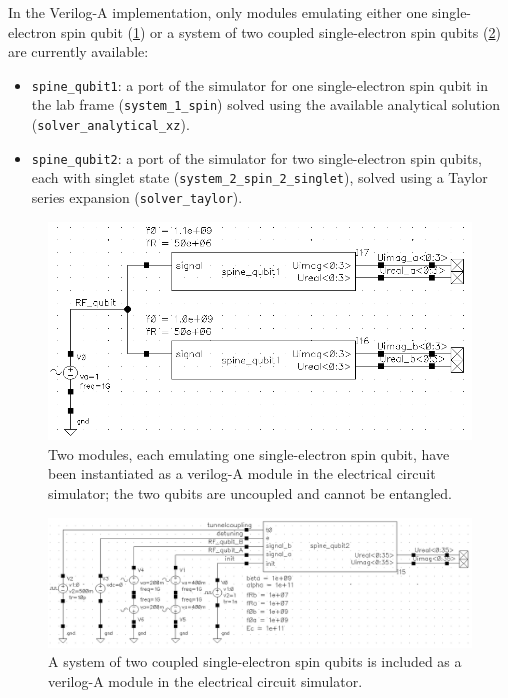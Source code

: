 \documentclass[10pt,a4paper,onecolumn,notitlepage]{article}
\begin{document}
In the Verilog-A implementation, only modules emulating either one single-electron spin qubit (\cref{fig:spine_spine1}) or a system of two coupled single-electron spin qubits (\cref{fig:spine_spine2}) are currently available:
\begin{itemize}
	\item \lstinline{spine_qubit1}: a port of the simulator for one single-electron spin qubit in the lab frame (\lstinline{system_1_spin}) solved using the available analytical solution (\lstinline{solver_analytical_xz}).
	\item \lstinline{spine_qubit2}: a port of the simulator for two single-electron spin qubits, each with singlet state (\lstinline{system_2_spin_2_singlet}), solved using a Taylor series expansion (\lstinline{solver_taylor}).
\end{itemize}

\begin{figure}[htbp]
	\centering
	\includegraphics[width=0.6\linewidth]{figures/spine_1_bw.png}
	\caption{Two modules, each emulating one single-electron spin qubit, have been instantiated as a verilog-A module in the electrical circuit simulator; the two qubits are uncoupled and cannot be entangled.}
	\label{fig:spine_spine1}
\end{figure}

\begin{figure}[htbp]
	\centering
	\includegraphics[width=\linewidth]{figures/spine_2_bw.png}
	\caption{A system of two coupled single-electron spin qubits is included as a verilog-A module in the electrical circuit simulator.}
	\label{fig:spine_spine2}
\end{figure}
\end{document}
